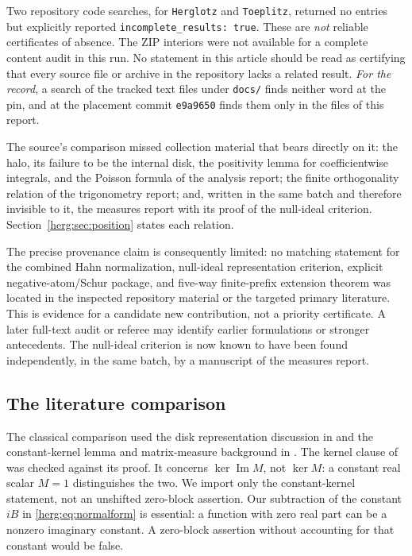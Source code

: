 \documentclass[11pt,letterpaper]{article}
\theoremstyle{definition}
\newcommand{\Ima}{\operatorname{Im}}
\numberwithin{equation}{section}
\begin{document}
Two repository code searches, for \texttt{Herglotz} and \texttt{Toeplitz}, returned no entries but explicitly reported \texttt{incomplete\_results: true}. These are \emph{not} reliable certificates of absence. The ZIP interiors were not available for a complete content audit in this run. No statement in this article should be read as certifying that every source file or archive in the repository lacks a related result. \emph{For the record}, a search of the tracked text files under \texttt{docs/} finds neither word at the pin, and at the placement commit \texttt{e9a9650} finds them only in the files of this report.

The source's comparison missed collection material that bears directly on it: the halo, its failure to be the internal disk, the positivity lemma for coefficientwise integrals, and the Poisson formula of the analysis report; the finite orthogonality relation of the trigonometry report; and, written in the same batch and therefore invisible to it, the measures report with its proof of the null-ideal criterion. Section~\ref{herg:sec:position} states each relation.

The precise provenance claim is consequently limited: no matching statement for the combined Hahn normalization, null-ideal representation criterion, explicit negative-atom/Schur package, and five-way finite-prefix extension theorem was located in the inspected repository material or the targeted primary literature. This is evidence for a candidate new contribution, not a priority certificate. A later full-text audit or referee may identify earlier formulations or stronger antecedents. The null-ideal criterion is now known to have been found independently, in the same batch, by a manuscript of the measures report.

\subsection{The literature comparison}

The classical comparison used the disk representation discussion in \cite{BBK} and the constant-kernel lemma and matrix-measure background in \cite{GT}. The kernel clause of \cite[Lemma~5.3, preprint pp.~26--27]{GT} was
checked against its proof. It concerns $\ker\Ima M$, not $\ker M$:
a constant real scalar $M=1$ distinguishes the two. We import only the
constant-kernel statement, not an unshifted zero-block assertion. Our subtraction of the constant $iB$ in \eqref{herg:eq:normalform} is essential: a function with zero real part can be a nonzero imaginary constant. A zero-block assertion without accounting for that constant would be false.
\end{document}
